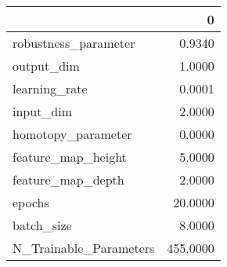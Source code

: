\begin{tabular}{lr}
\toprule
{} &         0 \\
\midrule
robustness\_parameter   &    0.9340 \\
output\_dim             &    1.0000 \\
learning\_rate          &    0.0001 \\
input\_dim              &    2.0000 \\
homotopy\_parameter     &    0.0000 \\
feature\_map\_height     &    5.0000 \\
feature\_map\_depth      &    2.0000 \\
epochs                 &   20.0000 \\
batch\_size             &    8.0000 \\
N\_Trainable\_Parameters &  455.0000 \\
\bottomrule
\end{tabular}
